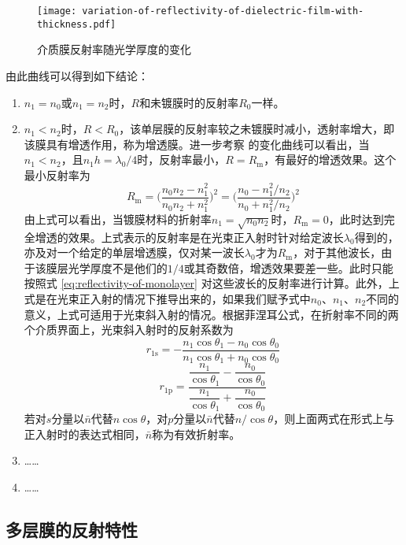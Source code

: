 \documentclass[cn,10pt,chinesefont=founder,math=mtpro2,cite=super,toc=onecol,twoside,openany]{elegantbook}
\begin{document}
\begin{figure}[htbp]
	\centering
	\texttt{[image: variation-of-reflectivity-of-dielectric-film-with-thickness.pdf]}
	\caption{介质膜反射率随光学厚度的变化}
	\label{fig:variation-of-reflectivity-of-dielectric-film-with-thickness}
\end{figure}

由此曲线可以得到如下结论：
\begin{enumerate}
	\item $n_1=n_0$或$n_1=n_2$时，$R$和未镀膜时的反射率$R_0$一样。
	\item $n_1<n_2$时，$R<R_0$，该单层膜的反射率较之未镀膜时减小，透射率增大，即该膜具有增透作用，称为增透膜。进一步考察 的变化曲线可以看出，当$n_1<n_2$，且$n_1h=\lambda_0/4$时，反射率最小，$R=R_\mathrm{m}$，有最好的增透效果。这个最小反射率为
	\begin{equation}
	R_\mathrm{m}=\bigg(\frac{n_0n_2-n^2_1}{n_0n_2+n^2_1}\bigg)^2=\bigg(\frac{n_0-n^2_1/n_2}{n_0+n^2_1/n_2}\bigg)^2
	\end{equation}
	由上式可以看出，当镀膜材料的折射率$n_1=\sqrt{n_0n_2}$时，$R_\mathrm{m}=0$，此时达到完全增透的效果。上式表示的反射率是在光束正入射时针对给定波长$\lambda_0$得到的，亦及对一个给定的单层增透膜，仅对某一波长$\lambda_0$才为$R_\mathrm{m}$，对于其他波长，由于该膜层光学厚度不是他们的$1/4$或其奇数倍，增透效果要差一些。此时只能按照式 \eqref{eq:reflectivity-of-monolayer} 对这些波长的反射率进行计算。此外，上式是在光束正入射的情况下推导出来的，如果我们赋予式中$n_0$、$n_1$、$n_2$不同的意义，上式可适用于光束斜入射的情况。根据菲涅耳公式，在折射率不同的两个介质界面上，光束斜入射时的反射系数为
	\begin{equation}
	r_{1\mathrm{s}}=-\frac{n_1\cos\theta_1-n_0\cos\theta_0}{n_1\cos\theta_1+n_0\cos\theta_0}
	\end{equation}
	\begin{equation}
	r_{1\mathrm{p}}=\frac{\dfrac{n_1}{\cos\theta_1}-\dfrac{n_0}{\cos\theta_0}}{\dfrac{n_1}{\cos\theta_1}+\dfrac{n_0}{\cos\theta_0}}
	\end{equation}
	若对$s$分量以$\bar{n}$代替$n\cos\theta$，对$p$分量以$\bar{n}$代替$n/\cos\theta$，则上面两式在形式上与正入射时的表达式相同，$\bar{n}$称为有效折射率。
	\item ……
	\item ……
\end{enumerate}

\subsection{多层膜的反射特性}
\end{document}
